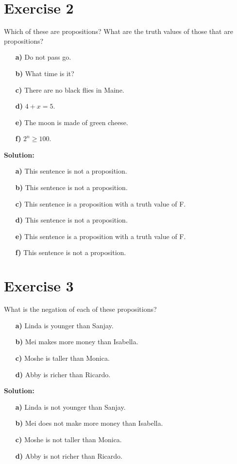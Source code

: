 \documentclass{Axon}
\begin{document}
\section*{Exercise 2}
Which of these are propositions? What are the truth values of those that are propositions?
\begin{enumerate}
    \item[\textbf{a)}] Do not pass go.
    \item[\textbf{b)}] What time is it?
    \item[\textbf{c)}] There are no black flies in Maine.
    \item[\textbf{d)}] \(4 + x = 5\).
    \item[\textbf{e)}] The moon is made of green cheese.
    \item[\textbf{f)}] \(2^n \geq 100\).
\end{enumerate}

\noindent
\textbf{Solution:}
\begin{enumerate}
    \item[\textbf{a)}] This sentence is not a proposition.
    \item[\textbf{b)}] This sentence is not a proposition.
    \item[\textbf{c)}] This sentence is a proposition with a truth value of F.
    \item[\textbf{d)}] This sentence is not a proposition.
    \item[\textbf{e)}] This sentence is a proposition with a truth value of F.
    \item[\textbf{f)}] This sentence is not a proposition.
\end{enumerate}

\section*{Exercise 3}
What is the negation of each of these propositions?
\begin{enumerate}
    \item[\textbf{a)}] Linda is younger than Sanjay.
    \item[\textbf{b)}] Mei makes more money than Isabella.
    \item[\textbf{c)}] Moshe is taller than Monica.
    \item[\textbf{d)}] Abby is richer than Ricardo.
\end{enumerate}

\noindent
\textbf{Solution:}
\begin{enumerate}
    \item[\textbf{a)}] Linda is not younger than Sanjay.
    \item[\textbf{b)}] Mei does not make more money than Isabella.
    \item[\textbf{c)}] Moshe is not taller than Monica.
    \item[\textbf{d)}] Abby is not richer than Ricardo.
\end{enumerate}
\end{document}
